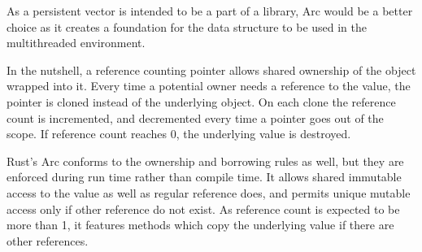 
As a persistent vector is intended to be a part of a library, Arc would be a better choice as it creates a foundation for the data structure to be used in the multithreaded environment. 


In the nutshell, a reference counting pointer allows shared ownership of the object wrapped into it. Every time a potential owner needs a reference to the value, the pointer is cloned instead of the underlying object. On each clone the reference count is incremented, and decremented every time a pointer goes out of the scope. If reference count reaches 0, the underlying value is destroyed. 

Rust’s Arc conforms to the ownership and borrowing rules as well, but they are enforced during run time rather than compile time. It allows shared immutable access to the value as well as regular reference does, and permits unique mutable access only if other reference do not exist. As reference count is expected to be more than 1, it features methods which copy the underlying value if there are other references. 


